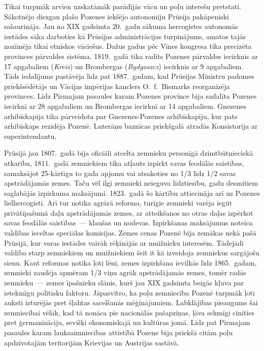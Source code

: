 \documentclass[twoside,a5paper,12pt,fleqn,openany]{extbook}
\newcommand{\pltxti}[1]{\textit{\textpolish{#1}}}
\newcommand{\detxti}[1]{\textit{\textgerman{#1}}}
\begin{document}
Tikai turpmāk arvien uzskatāmāk parādījās vācu un poļu interešu pretstati. Sākotnējo diezgan plašo Pozenes iekšējo autonomiju Prūsija pakāpeniski sašaurināja. Jau no XIX gadsimta 20.~gadu sākuma hercogistes autonomās iestādes sāka darboties kā Prūsijas administrācijas turpinājums, amatos tajās nozīmēja tikai etniskos vāciešus. Dažus gadus pēc Vīnes kongresa tika precizēta provinces pārvaldes sistēma. 1819.~gadā tika radīts Pozenes pārvaldes iecirknis ar 17 apgabaliem (\detxti{Kreis}) un Brombergas (\pltxti{Bydgoszcz}) iecirknis ar 9 apgabaliem. Tāds iedalījums pastāvēja līdz pat 1887.~gadam, kad Prūsijas Ministru padomes priekšsēdētājs un Vācijas impērijas kanclers O.~f.~Bismarks reorganizēja provinces. Līdz Pirmajam pasaules karam Pozenes province bija sadalīta Pozenes iecirknī ar 28 apgabaliem un Brombergas iecirknī ar 14 apgabaliem. Gnezenes arhibīskapija tika pārveidota par Gnezenes-Pozenes arhibīskapiju, kur pats arhibīskaps rezidēja Pozenē. Luterāņu baznīcas priekšgalā atradās Konsistorija ar superintendantu.

Prūsijā jau 1807.~gadā bija oficiāli atcelta zemnieku personīgā dzimtbūtnieciskā atkarība, 1811.~gadā zemniekiem tika atļauts izpirkt savas feodālās saistības, samaksājot 25-kārtīgu to gada apjomu vai atsakoties no 1/3 līdz 1/2 savas apstrādājamās zemes. Taču vēl ilgi zemnieki neieguva līdztiesību, gadu desmitiem saglabājās izpirkuma maksājumi. 1823.~gadā šo kārtību attiecināja arī uz Pozenes lielhercogisti. Arī tur notika agrārā reforma, turīgie zemnieki varēja iegūt privātīpašumā daļu apstrādājamās zemes, ar atteikšanos no otras daļas izpērkot savas feodālās saistības~--- klaušas un nodevas. Izpirkšanas maksājumus noteica valdības ieceltas speciālas komisijas. Zemes cenas Pozenē bija zemākas nekā pašā Prūsijā, kur varas iestādes vairāk rēķinājās ar muižnieku interesēm. Tādejādi valdība starp zemniekiem un muižniekiem šeit it kā izveidoja zemniekus sargājošu sienu. Kaut reformas notika ļoti lēni, zemes izpirkšana ievilkās līdz 1865.~gadam, zemnieki zaudēja apmēram 1/3 viņu agrāk apstrādājamās zemes, tomēr radās zemnieku~--- zemes īpašnieku slānis, kurš jau XIX gadsimta beigās kļuva par ietekmīgu politisku faktoru. Jāpasvītro, ka poļu zemniecība Pozenē turpmāk ļoti auksti izturējās pret šļahtas sacelšanās mēģinājumiem. Labklājības pieaugums šai zemniecībai vēlāk, kad tā nonāca pie nacionālās pašapziņas, ļāva sekmīgi cīnīties pret ģermanizāciju, sevišķi ekonomiskajā un kultūras jomā. Līdz pat Pirmajam pasaules karam lauksaimniecības attīstībā Pozene bija priekšā citām poļu apdzīvotajām teritorijām Krievijas un Austrijas sastāvā.
\end{document}
